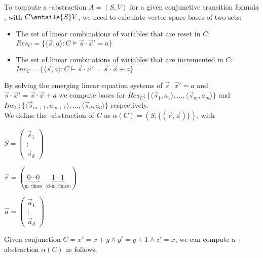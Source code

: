To compute a \qvasr-abstraction $A = (S, V)$ for a given conjunctive transition formula \conjunctTF, with $C \entails{S} V$, we need to calculate vector space bases of two sets:
\begin{itemize}
 \item The set of linear combinations of variables that are reset in $C$: $Res_C = \{ \langle \vec{s}, a \rangle : C \models \vec{s} \cdot \vec{x}' = a \}$
 \item The set of linear combinations of variables that are incremented in $C$: $Inc_C = \{ \langle \vec{s}, a \rangle : C \models \vec{s} \cdot \vec{x}' = \vec{s} \cdot \vec{x} + a \}$
\end{itemize}
By solving the emerging linear equation systems of $ \vec{s} \cdot \vec{x}' = a$ and $\vec{s} \cdot \vec{x}' = \vec{s} \cdot \vec{x} + a $ we compute bases for $Res_C: \{\langle \vec{s}_1, a_1 \rangle, \ldots, \langle \vec{s}_m, a_m \rangle\}$ and $Inc_C: \{ \langle \vec{s}_{m+1}, a_{m+1} \rangle , \ldots, \langle \vec{s}_d, a_d\rangle \}$ respectively. \\ We define the \qvasr-abstraction of $C$ as $\alpha(C) = (S, \{(\vec{r}, \vec{a})\})$, with \\

\begin{minipage}{0.3\textwidth}
\centering
    $ S = \begin{pmatrix}
            \vec{s}_1 \\
            \vdots \\
            \vec{s}_d
            \end{pmatrix}$
\end{minipage}
\begin{minipage}{0.3\textwidth}
\centering
$\vec{r} = (\underbrace{0 \cdots 0}_{\text{m times}} \ \ \underbrace{1 \cdots 1}_{\text{(d-m times)}})$
\end{minipage}
\begin{minipage}{0.3\textwidth}
\centering
$\vec{a} = \begin{pmatrix}
            \vec{a}_1 \\
            \vdots \\
            \vec{a}_d
            \end{pmatrix}$
\end{minipage}

\begin{example}
Given conjunction $C = x' = x+ y \land y' = y+ 1 \land z' = x$, we can compute a \qvasr-abstraction $\alpha(C)$ as follows: \\

\end{example}

